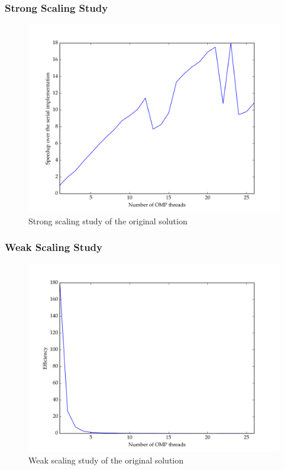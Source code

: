 \documentclass[11pt]{article}
\begin{document}
\subsubsection{Strong Scaling Study}
\begin{figure}[H]
\centering
\includegraphics[scale=0.8]{./scaling_studies/strong_scaling_original.png}
\caption{Strong scaling study of the original solution}
\label{fig:ss_orig}
\end{figure}
\subsubsection{Weak Scaling Study}
\begin{figure}[H]
\centering
\includegraphics[scale=0.8]{./scaling_studies/weak_scaling_original.png}
\caption{Weak scaling study of the original solution}
\label{fig:ss_orig}
\end{figure}
\end{document}
